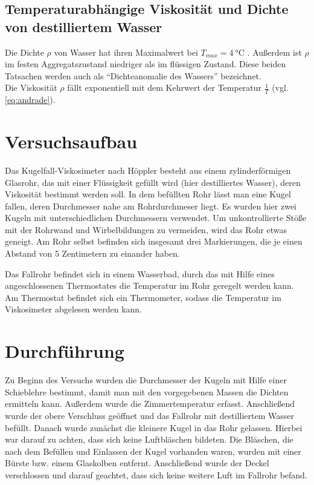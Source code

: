 \subsection{Temperaturabhängige Viskosität und Dichte von destilliertem Wasser}
Die Dichte $\rho$ von Wasser hat ihren Maximalwert bei $T_{max} = \qty[]{4}{\degreeCelsius}$ \cite*[]{geschke}.
Außerdem ist $\rho$ im festen Aggregatszustand niedriger als im flüssigen Zustand. 
Diese beiden Tatsachen werden auch als \enquote{Dichteanomalie des Wassers} bezeichnet\cite*[]{demtroeder}.\\
Die Viskosität $\rho$ fällt exponentiell mit dem Kehrwert der Temperatur $\frac{1}{T}$ (vgl. \eqref{eq:andrade}).



\section[]{Versuchsaufbau}
Das Kugelfall-Viskosimeter nach Höppler besteht aus einem zylinderförmigen Glasrohr,
das mit einer Flüssigkeit gefüllt wird (hier destilliertes Wasser), deren Viskosität bestimmt werden soll. 
In dem befüllten Rohr lässt man eine Kugel fallen, deren Durchmesser nahe am Rohrdurchmeser liegt.
Es wurden hier zwei Kugeln mit unterschiedlichen Durchmessern verwendet. 
Um unkontrollierte Stöße mit der Rohrwand und Wirbelbildungen zu vermeiden, wird das Rohr etwas geneigt.
Am Rohr selbst befinden sich insgesamt drei Markierungen, die je einen Abstand von 5 Zentimetern zu einander haben.

Das Fallrohr befindet sich in einem Wasserbad, durch das mit Hilfe eines angeschlossenen Thermostates die Temperatur im Rohr geregelt werden kann.
Am Thermostat befindet sich ein Thermometer, sodass die Temperatur im Viskosimeter abgelesen werden kann.



\section{Durchführung}
Zu Beginn des Versuchs wurden die Durchmesser der Kugeln mit Hilfe einer Schieblehre bestimmt, damit man mit den vorgegebenen Massen die Dichten ermitteln kann.
Außerdem wurde die Zimmertemperatur erfasst.
Anschließend wurde der obere Verschluss geöffnet und das Fallrohr mit destilliertem Wasser befüllt. 
Danach wurde zunächst die kleinere Kugel in das Rohr gelassen.
Hierbei war darauf zu achten, dass sich keine Luftbläschen bildeten.
Die Bläschen, die nach dem Befüllen und Einlassen der Kugel vorhanden waren, wurden mit einer Bürste bzw. einem Glaskolben entfernt.
Anschließend wurde der Deckel verschlossen und darauf geachtet, dass sich keine weitere Luft im Fallrohr befand.

